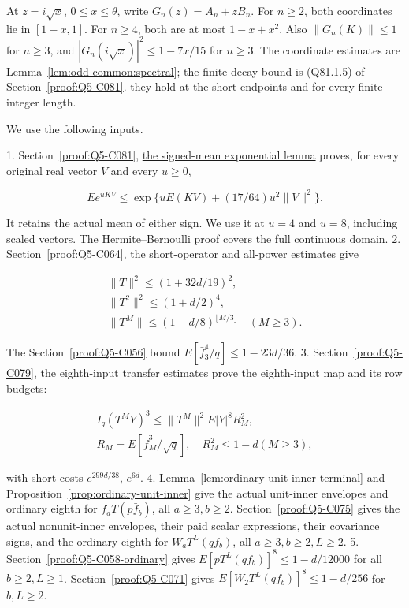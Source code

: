 At \(z=\allowbreak i\sqrt x\), \(0\le\allowbreak  x\le\allowbreak \theta\), write
\(G_n(z)=\allowbreak A_n+zB_n\). For \(n\ge\allowbreak 2\), both coordinates lie in
\([1-x,\allowbreak  1]\). For \(n\ge\allowbreak 4\), both are at most \(1-x+x^2\).
Also \(\|G_n(K)\|\le\allowbreak 1\) for \(n\ge\allowbreak 3\), and
\(|G_n(i\sqrt x)|^2\le\allowbreak 1-7x/15\) for \(n\ge\allowbreak 3\).
The coordinate estimates are Lemma~\ref{lem:odd-common:spectral}; the finite decay bound is (Q81.1.5) of Section~\ref{proof:Q5-C081}.
they hold at the short endpoints and for every finite integer length.

We use the following inputs.

1. Section~\ref{proof:Q5-C081}, \hyperref[part:Q81.2]{the signed-mean exponential lemma} proves, for every original real vector \(V\) and
   every \(u\ge\allowbreak 0\),

\[
   Ee^{uKV}\le
   \exp\{uE(KV)+(17/64)u^2\|V\|^2\}.
   \tag{Q87.1.5}\label{eq:Q87:1.5}
\]

   It retains the actual mean of either sign. We use it at \(u=\allowbreak 4\)
   and \(u=\allowbreak 8\), including scaled vectors. The Hermite--Bernoulli proof covers the full continuous domain.
2. Section~\ref{proof:Q5-C064}, the short-operator and all-power estimates give

\[
\begin{gathered}
\|T\|^2\le(1+32d/19)^2,\quad\\
\|T^2\|^2\le(1+d/2)^4,\quad\\
\|T^M\|\le(1-d/8)^{\lfloor M/3\rfloor}\quad(M\ge3).
\end{gathered}\tag{Q87.1.6}\label{eq:Q87:1.6}
\]

   The Section~\ref{proof:Q5-C056} bound
   \(E[\bar f_3^4/q]\le\allowbreak 1-23d/36\).
3. Section~\ref{proof:Q5-C079}, the eighth-input transfer estimates prove the eighth-input map and its row budgets:

\[
\begin{gathered}
I_q(T^M Y)^3\le\|T^M\|^2E|Y|^8R_M^2,\quad\\
R_M=E[\bar f_M^3/\sqrt q],\quad R_M^2\le1-d (M\ge3),
\end{gathered}\tag{Q87.1.7}\label{eq:Q87:1.7}
\]

   with short costs \(e^{299d/38}\), \(e^{6d}\).
4. Lemma~\ref{lem:ordinary-unit-inner-terminal} and Proposition~\ref{prop:ordinary-unit-inner} give the actual unit-inner envelopes and ordinary eighth
   for \(f_aT(p\bar f_b)\), all \(a\ge\allowbreak 3,\allowbreak  b\ge\allowbreak 2\). Section~\ref{proof:Q5-C075} gives the actual
   nonunit-inner envelopes, their paid scalar expressions, their
   covariance signs, and the ordinary eighth for
   \(W_aT^L(qf_b)\), all \(a\ge\allowbreak 3,\allowbreak  b\ge\allowbreak 2,\allowbreak  L\ge\allowbreak 2\).
5. Section~\ref{proof:Q5-C058-ordinary} gives \(E[pT^L(qf_b)]^8\le\allowbreak 1-d/12000\) for all \(b\ge\allowbreak 2,\allowbreak  L\ge\allowbreak 1\).
   Section~\ref{proof:Q5-C071} gives \(E[W_2T^L(qf_b)]^8\le\allowbreak 1-d/256\) for \(b,\allowbreak  L\ge\allowbreak 2\).


